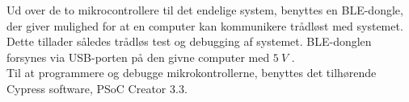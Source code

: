 Ud over de to mikrocontrollere til det endelige system, benyttes en BLE-dongle, der giver mulighed for at en computer kan kommunikere trådløst med systemet. Dette tillader således trådløs test og debugging af systemet. BLE-donglen forsynes via USB-porten på den givne computer med $5~V$ \citep{cypressguide2014}. 
\\

Til at programmere og debugge mikrokontrollerne, benyttes det tilhørende Cypress software, PSoC Creator 3.3. 







